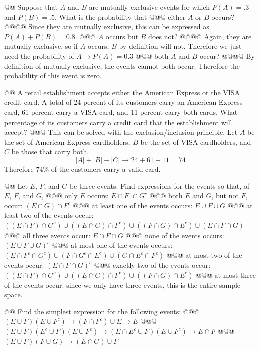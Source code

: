 \documentclass[10pt]{article}
\begin{document}
\begin{easylist}[enumerate]
    @@ Suppose that $A$ and $B$ are mutually exclusive events for which $P(A) = .3$ and $P(B) = .5$. What is the probability that
    @@@ either $A$ or $B$ occurs?
    @@@@ Since they are mutually exclusive, this can be expressed as $P(A) + P(B) = \boxed{0.8}$.
    @@@ $A$ occurs but $B$ does not?
    @@@@ Again, they are mutually exclusive, so if $A$ occurs, $B$ by definition will not. Therefore we just need the probability of $A \to P(A) = 0.3$
    @@@ both $A$ and $B$ occur?
    @@@@ By definition of mutually exclusive, the events cannot both occur. Therefore the probability of this event is zero.

    @@ A retail establishment accepts either the American Express or the VISA credit card. A total of 24 percent of its customers carry an American Express card, 61 percent carry a VISA card, and 11 percent carry both cards. What percentage of its customers carry a credit card that the establishment will accept?
    @@@ This can be solved with the exclusion/inclusion principle. Let $A$ be the set of American Express cardholders, $B$ be the set of VISA cardholders, and $C$ be those that carry both.
        \[ |A| + |B| - |C| \to 24 + 61 - 11 = 74 \]
       Therefore $74$\% of the customers carry a valid card.

    @@ Let $E$, $F$, and $G$ be three events. Find expressions for the events so that, of $E$, $F$, and $G$,
    @@@ only $E$ occurs: $E \cap F^c \cap G^c$
    @@@ both $E$ and $G$, but not $F$, occur: $(E \cap G) \cap F^c$
    @@@ at least one of the events occurs: $E \cup F \cup G$
    @@@ at least two of the events occur: $((E \cap F) \cap G^c) \cup ((E \cap G) \cap F^c) \cup ((F \cap G) \cap E^c) \cup (E \cap F \cap G)$
    @@@ all three events occur: $ E \cap F \cap G$
    @@@ none of the events occurs: $ {(E \cup F \cup G)}^c$
    @@@ at most one of the events occurs: $(E \cap F^c \cap G^c) \cup (F \cap G^c \cap E^c) \cup (G \cap E^c \cap F^c)$
    @@@ at most two of the events occur: ${(E \cap F \cap G)}^c$
    @@@ exactly two of the events occur: $((E \cap F) \cap G^c) \cup ((E \cap G) \cap F^c) \cup ((F \cap G) \cap E^c)$
    @@@ at most three of the events occur: since we only have three events, this is the entire sample space.

    @@ Find the simplest expression for the following
    events:
    @@@ $(E \cup F)(E \cup F^c) \to (F \cap F^c) \cup E \to E$
    @@@ $(E \cup F)(E^c \cup F)(E \cup F^c) \to (E \cap E^c \cup F)(E \cup F^c) \to E \cap F$
    @@@ $(E \cup F)(F \cup G) \to (E \cap G) \cup F$


\end{easylist}
\end{document}
